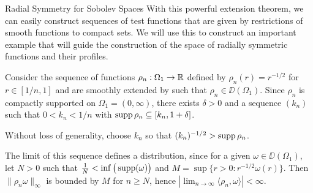 \begin{chapter}{Radial Symmetry for Sobolev Spaces}
With this powerful extension theorem, we can easily construct sequences of test functions that are given by restrictions of smooth functions to compact sets.
We will use this to construct an important example that will guide the construction of the space of radially symmetric functions and their profiles.

Consider the sequence of functions $\rho_n:\Omega_1 \to \mathbb R$ defined by $\rho_n(r) = r^{-1/2}$ for $r\in [1/n,1]$ and are smoothly extended  by  such that $\rho_n \in \DD(\Omega_1)$.
Since $\rho_n$ is compactly supported on $\Omega_1 = (0,\infty)$, there exists $\delta>0$ and a sequence $(k_n)$ such that $0<k_n<1/n$ with $\operatorname*{supp} \rho_n \subseteq \left[k_n,1+\delta\right]$.
\begin{com}
Without loss of generality, choose $k_n$ so that $(k_n)^{-1/2} > \operatorname*{supp} \rho_n$.
\end{com}
The limit of this sequence defines a distribution, since for a given $\omega \in \DD(\Omega_1)$, let $N>0$ such that $\frac 1N < \inf \big(\operatorname*{supp} (\omega)\big)$ and $M = \sup \{r>0:r^{-1/2}\omega(r)\}$. 
Then $\|\rho_n \omega \|_{\infty}$ is bounded by $M$ for $n\ge N$, hence $\displaystyle{\left|\lim_{n\to\infty} \langle \rho_n,\omega\rangle\right| < \infty}$.


\end{chapter}
